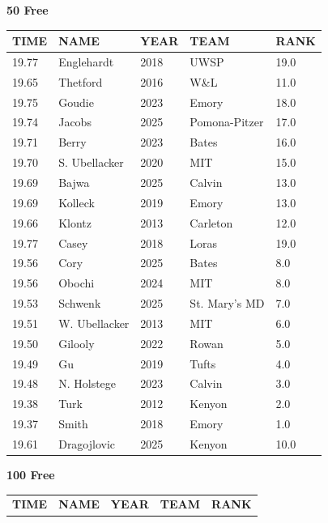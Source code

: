 \begin{table}[H]
\centering
\begin{minipage}[t]{0.48\textwidth}
\centering
\textbf{50 Free}\\[0.1cm]
\begin{tabular}{@{}p{1.8cm}p{2.8cm}p{1.2cm}p{1.4cm}p{0.8cm}@{}}
\hline
    \textbf{TIME} & \textbf{NAME} & \textbf{YEAR} & \textbf{TEAM} & \textbf{RANK} \\
\hline
    19.77 & Englehardt & 2018 & UWSP & 19.0 \\
    19.65 & Thetford & 2016 & W\&L & 11.0 \\
    19.75 & Goudie & 2023 & Emory & 18.0 \\
    19.74 & Jacobs & 2025 & Pomona-Pitzer & 17.0 \\
    19.71 & Berry & 2023 & Bates & 16.0 \\
    19.70 & S. Ubellacker & 2020 & MIT & 15.0 \\
    19.69 & Bajwa & 2025 & Calvin & 13.0 \\
    19.69 & Kolleck & 2019 & Emory & 13.0 \\
    19.66 & Klontz & 2013 & Carleton & 12.0 \\
    19.77 & Casey & 2018 & Loras & 19.0 \\
    19.56 & Cory & 2025 & Bates & 8.0 \\
    19.56 & Obochi & 2024 & MIT & 8.0 \\
    19.53 & Schwenk & 2025 & St. Mary's MD & 7.0 \\
    19.51 & W. Ubellacker & 2013 & MIT & 6.0 \\
    19.50 & Gilooly & 2022 & Rowan & 5.0 \\
    19.49 & Gu & 2019 & Tufts & 4.0 \\
    19.48 & N. Holstege & 2023 & Calvin & 3.0 \\
    19.38 & Turk & 2012 & Kenyon & 2.0 \\
    19.37 & Smith & 2018 & Emory & 1.0 \\
    19.61 & Dragojlovic & 2025 & Kenyon & 10.0 \\
\hline
\end{tabular}
\end{minipage}\hfill
\begin{minipage}[t]{0.48\textwidth}
\centering
\textbf{100 Free}\\[0.1cm]
\begin{tabular}{@{}p{1.8cm}p{2.8cm}p{1.2cm}p{1.4cm}p{0.8cm}@{}}
\hline
    \textbf{TIME} & \textbf{NAME} & \textbf{YEAR} & \textbf{TEAM} & \textbf{RANK} \\

\end{tabular}
\end{minipage}
\end{table}
